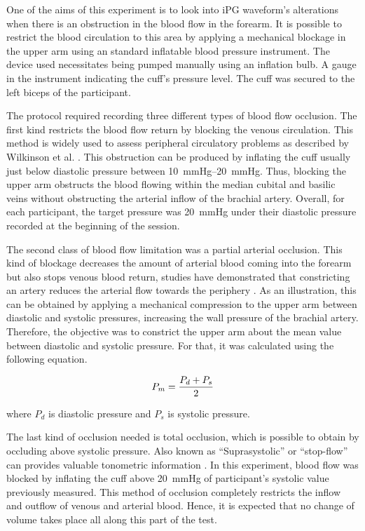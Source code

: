 One of the aims of this experiment is to look into iPG waveform's alterations when there is an obstruction in the blood flow in the forearm. It is possible to restrict the blood circulation to this area by applying a mechanical blockage in the upper arm using an standard inflatable blood pressure instrument. The device used necessitates being pumped manually using an inflation bulb. A gauge in the instrument indicating the cuff's pressure level. The cuff was secured to the left biceps of the participant. 

The protocol required recording three different types of blood flow occlusion. The first kind restricts the blood flow return by blocking the venous circulation. This method is widely used to assess peripheral circulatory problems as described by Wilkinson et al. \cite{wilkinson2001venous}. This obstruction can be produced by inflating the cuff usually just below diastolic pressure between \SIrange{10}{20}{\mmHg}. Thus, blocking the upper arm obstructs the blood flowing within the median cubital and basilic veins without obstructing the arterial inflow of the brachial artery.  Overall, for each participant, the target pressure was \SI{20}{\mmHg} under their diastolic pressure recorded at the beginning of the session.

The second class of blood flow limitation was a partial arterial occlusion. This kind of blockage decreases the amount of arterial blood coming into the forearm but also stops venous blood return, studies have demonstrated that constricting an artery reduces the arterial flow towards the periphery \cite{uchida1977cyclical}. As an illustration, this can be obtained by applying a mechanical compression to the upper arm between diastolic and systolic pressures, increasing the wall pressure of the brachial artery. Therefore, the objective was to constrict the upper arm about the mean value between diastolic and systolic pressure. For that, it was calculated using the following equation.

\begin{align}
	\label{eq:meanpressure}
	P_m = \frac{P_d + P_s}{2} \tagaddtext{[\si{\mmHg}]}
\end{align}

where $P_d$ is diastolic pressure and $P_s$ is systolic pressure. 

The last kind of occlusion needed is total occlusion, which is possible to obtain by occluding above systolic pressure. Also known as  “Suprasystolic” or “stop-flow” can provides valuable tonometric information \cite{lowe2009non}. In this experiment, blood flow was blocked by inflating the cuff above \SI{20}{\mmHg} of participant's systolic value previously measured. This method of occlusion completely restricts the inflow and outflow of venous and arterial blood. Hence, it is expected that no change of volume takes place all along this part of the test.

